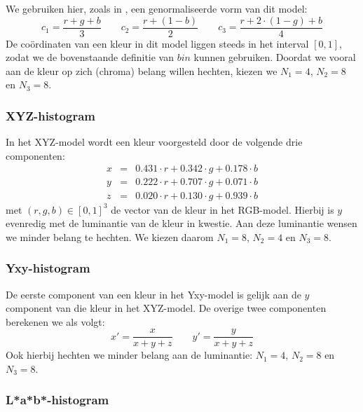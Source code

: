 We gebruiken hier, zoals in \cite{wang:cbir_using_daubechies_wavelets}, een genormaliseerde vorm van dit model:
$$
c_1 = \frac{r+g+b}{3} \qquad
c_2 = \frac{r + (1 - b)}{2} \qquad
c_3 = \frac{r + 2 \cdot (1 - g) + b}{4}
$$
De co\"ordinaten van een kleur in dit model liggen steeds in het interval $[0,1]$,
zodat we de bovenstaande definitie van $bin$ kunnen gebruiken. 
Doordat we vooral aan de kleur op zich (chroma) belang willen hechten, kiezen we 
$N_1=4$, $N_2=8$ en $N_3=8$.

\subsubsection{XYZ-histogram}

In het XYZ-model wordt een kleur voorgesteld door de volgende drie componenten:
$$
\begin{array}{rcl}
x & = & 0.431 \cdot r+0.342 \cdot g+0.178 \cdot b \\
y & = & 0.222 \cdot r+0.707 \cdot g+0.071 \cdot b \\
z & = & 0.020 \cdot r+0.130 \cdot g+0.939 \cdot b
\end{array}
$$
met $(r,g,b) \in [0,1]^3$ de vector van de kleur in het RGB-model. 
Hierbij is $y$ evenredig met de luminantie van de kleur in kwestie. Aan deze luminantie wensen
we minder belang te hechten. We kiezen daarom $N_1=8$, $N_2=4$ en $N_3=8$.

\subsubsection{Yxy-histogram}

De eerste component van een kleur in het Yxy-model is gelijk aan de $y$ component
van die kleur in het XYZ-model. De overige twee componenten berekenen we als volgt:
$$
x' = \frac{x}{x+y+z} \qquad
y' = \frac{y}{x+y+z}
$$
Ook hierbij hechten we minder belang aan de luminantie: $N_1=4$, $N_2=8$ en $N_3=8$.

\subsubsection{L*a*b*-histogram}

